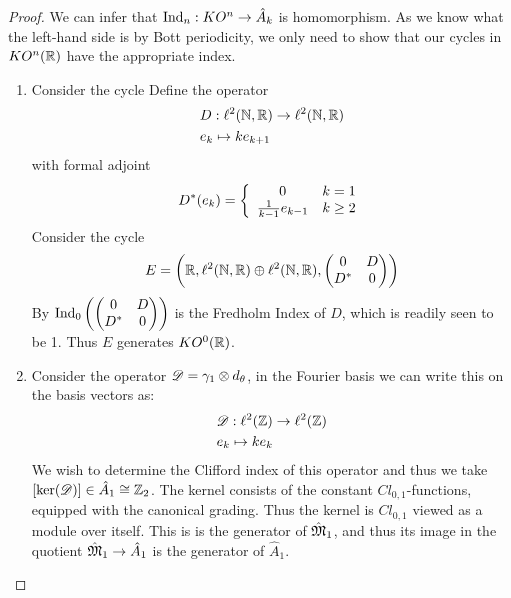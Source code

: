 \begin{proof}
We can infer that $\operatorname{Ind}_n: KO^n\to \hat{A}_k$ is homomorphism. As we know what the left-hand side is by Bott periodicity, we only need to show that our cycles in $KO^n(\mathbb{R})$ have the appropriate index. %
\begin{enumerate}
\item
	Consider the cycle 
	Define the operator 
	\begin{align*}
		&D:\ell^2(\mathbb{N},\mathbb{R})\to \ell^2(\mathbb{N},\mathbb{R}) \\
		&e_k\mapsto ke_{k+1}
	\end{align*}
	with formal adjoint 
	\begin{align*}
		D^*(e_k)=\left \{\begin{array}{c c} 0 & k=1 \\ \frac{1}{k-1}e_{k-1} &  k\geq 2 \end{array} \right .
	\end{align*}
	Consider the cycle 
	\begin{align*}
		E=\left ( \mathbb{R}, \ell^2(\mathbb{N},\mathbb{R})\oplus \ell^2(\mathbb{N},\mathbb{R}), \begin{pmatrix} 0 & D \\ D^* & 0\end{pmatrix} \right )
	\end{align*}
	By  $\operatorname{Ind}_0\left ( \begin{pmatrix} 0 & D \\ D^* & 0\end{pmatrix}  \right )$ is the Fredholm Index of $D$, which is readily seen to be 1. Thus $E$ generates $KO^{0}(\mathbb{R})$. 
\item
	Consider the operator $\mathscr{D}=\gamma_1\otimes d_\theta$, in the Fourier basis we can write this on the basis vectors as:
	\begin{align*}
		&\mathscr{D}: \ell^2(\mathbb{Z})\to \ell^2(\mathbb{Z}) \\
		&e_k\mapsto ke_k
	\end{align*}
	We wish to determine the Clifford index of this operator and thus we take $[\ker(\mathscr{D})]\in \hat{A}_1\cong \mathbb{Z}_2$. The kernel consists of the constant $Cl_{0,1}$-functions, equipped with the canonical grading. Thus the kernel is $Cl_{0,1}$ viewed as a module over itself. This is is the generator of $\hat{\mathfrak{M}}_1$, and thus its image in the quotient $\hat{\mathfrak{M}}_1\to \hat{A}_1$ is the generator of $\hat{A}_1$.  
	

\end{enumerate}
\end{proof}
